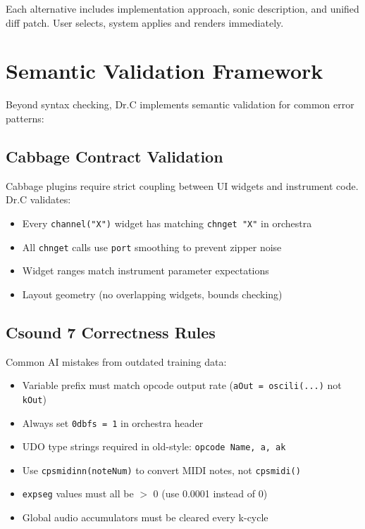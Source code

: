 \documentclass[a4paper]{article}
\begin{document}
Each alternative includes implementation approach, sonic description, and unified diff patch. User selects, system applies and renders immediately.

\section{Semantic Validation Framework}
\label{sec:validation}

Beyond syntax checking, Dr.C implements semantic validation for common error patterns:

\subsection{Cabbage Contract Validation}

Cabbage plugins require strict coupling between UI widgets and instrument code. Dr.C validates:

\begin{itemize}
\item Every \texttt{channel("X")} widget has matching \texttt{chnget "X"} in orchestra
\item All \texttt{chnget} calls use \texttt{port} smoothing to prevent zipper noise
\item Widget ranges match instrument parameter expectations
\item Layout geometry (no overlapping widgets, bounds checking)
\end{itemize}

\subsection{Csound 7 Correctness Rules}

Common AI mistakes from outdated training data:
\begin{itemize}
\item Variable prefix must match opcode output rate (\texttt{aOut = oscili(...)} not \texttt{kOut})
\item Always set \texttt{0dbfs = 1} in orchestra header
\item UDO type strings required in old-style: \texttt{opcode Name, a, ak}
\item Use \texttt{cpsmidinn(noteNum)} to convert MIDI notes, not \texttt{cpsmidi()}
\item \texttt{expseg} values must all be $>$ 0 (use 0.0001 instead of 0)
\item Global audio accumulators must be cleared every k-cycle
\end{itemize}
\end{document}
